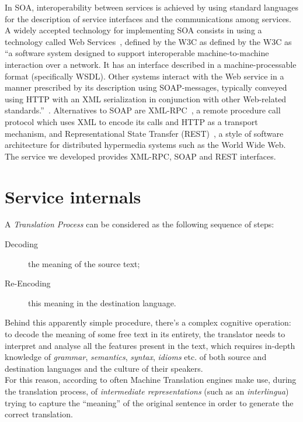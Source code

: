 \documentclass[11pt]{article}
\begin{document}
In SOA, interoperability between services is achieved by using standard languages for the description of service interfaces and the communications
among services. A widely accepted technology for implementing SOA consists in using a technology called Web Services~\citep{soa}, defined by the W3C
as defined by the W3C as ``a software system designed to support interoperable machine-to-machine interaction over a network. It has an interface 
described in a machine-processable format (specifically WSDL). Other systems interact with the Web service in a manner prescribed by its description 
using SOAP-messages, typically conveyed using HTTP with an XML serialization in conjunction with other Web-related standards.''~\citep{wsgloss}. 
Alternatives to SOAP are XML-RPC~\citep{xmlrpcspec}, a remote procedure call protocol which uses XML to encode its calls and HTTP as a transport 
mechanism, and Representational State Transfer (REST)~\citep{rest}, a style of software architecture for distributed hypermedia systems such as 
the World Wide Web.\\

The service we developed provides XML-RPC, SOAP and REST interfaces.


\section{Service internals}

A \emph{Translation Process} can be considered as the following sequence of steps:

\begin{description}
 \item[Decoding] the meaning of the source text;
 \item[Re-Encoding] this meaning in the destination language.
\end{description}

Behind this apparently simple procedure, there's a complex cognitive operation: to decode the meaning of some free text in its entirety, the translator
needs to interpret and analyse all the features present in the text, which requires in-depth knowledge of \emph{grammar}, \emph{semantics}, \emph{syntax},
\emph{idioms} etc. of both source and destination languages and the culture of their speakers.\\

For this reason, according to \citep{arnoldea} often Machine Translation engines make use, during the translation process, of \emph{intermediate representations} 
(such as an \emph{interlingua}) trying to capture the ``meaning'' of the original sentence in order to generate the  correct translation.
\end{document}
